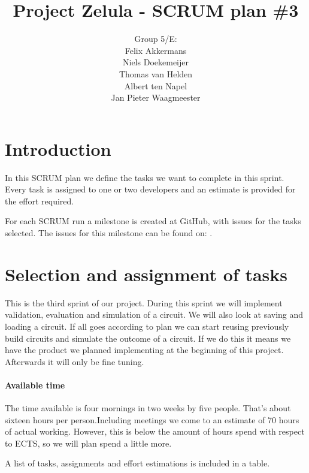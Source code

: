 \documentclass[a4paper]{article}
\title{Project Zelula - SCRUM plan \#3}
\author{Group 5/E:\\
Felix Akkermans \\
Niels Doekemeijer \\
Thomas van Helden \\
Albert ten Napel \\
Jan Pieter Waagmeester}
\begin{document}
\maketitle

\section{Introduction}
In this SCRUM plan we define the tasks we want to complete in this sprint. Every task is assigned to one or two developers and an estimate is provided for the effort required.

For each SCRUM run a milestone is created at GitHub, with issues for the tasks selected. The issues for this milestone can be found on: .

\section{Selection and assignment of tasks}
This is the third sprint of our project. During this sprint we will implement validation, evaluation and simulation of a circuit. We will also look at saving and loading a circuit. If all goes according to plan we can start reusing previously build circuits and simulate the outcome of a circuit. If we do this it means we have the product we planned implementing at the beginning of this project. Afterwards it will only be fine tuning.

\paragraph{Available time}
The time available is four mornings in two weeks by five people. That's about sixteen hours per person.Including meetings we come to an estimate of 70 hours of actual working. However, this is below the amount of hours spend with respect to ECTS, so we will plan spend a little more.

A list of tasks, assignments and effort estimations is included in a table.
\end{document}
